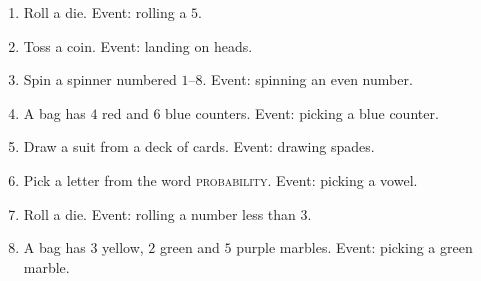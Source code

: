 \documentclass[11pt]{article}
\newcommand{\ans}{\hrulefill}
\newcommand{\anshere}{\par\vspace{0.4em}\noindent\ans\par\vspace{0.4em}}
\begin{document}
\begin{enumerate}[label=(\alph*)]
  \item Roll a die. Event: rolling a $5$.
  \anshere
  \item Toss a coin. Event: landing on heads.
  \anshere
  \item Spin a spinner numbered $1$--$8$. Event: spinning an even number.
  \anshere
  \item A bag has $4$ red and $6$ blue counters. Event: picking a blue counter.
  \anshere
  \item Draw a suit from a deck of cards. Event: drawing spades.
  \anshere
  \item Pick a letter from the word \textsc{probability}. Event: picking a vowel.
  \anshere
  \item Roll a die. Event: rolling a number less than $3$.
  \anshere
  \item A bag has $3$ yellow, $2$ green and $5$ purple marbles. Event: picking a green marble.
  \anshere
\end{enumerate}
\end{document}
